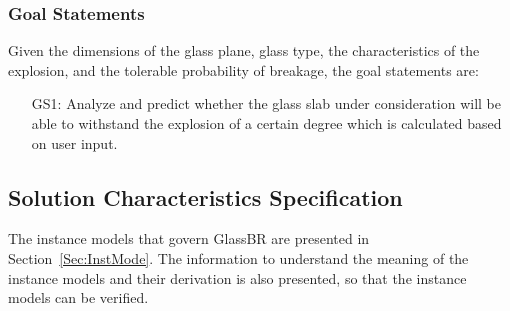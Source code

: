 \documentclass[12pt]{article}
\begin{document}
\subsubsection{Goal Statements}
\label{Sec:GoalStat}
Given the dimensions of the glass plane, glass type, the characteristics of the explosion, and the tolerable probability of breakage, the goal statements are:
\begin{itemize}
\item[GS1:]Analyze and predict whether the glass slab under consideration will be able to withstand the explosion of a certain degree which is calculated based on user input.
\end{itemize}
\subsection{Solution Characteristics Specification}
\label{Sec:SoluCharSpec}
The instance models that govern GlassBR are presented in Section~\ref{Sec:InstMode}. The information to understand the meaning of the instance models and their derivation is also presented, so that the instance models can be verified.
\end{document}
